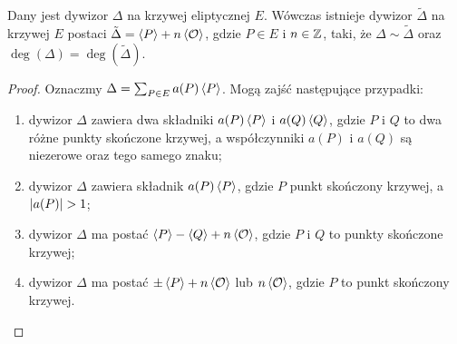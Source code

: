 \begin{theorem}\label{divisor_linear_reduction_theorem}
Dany jest dywizor $\Delta$ na krzywej eliptycznej $E$.
Wówczas istnieje dywizor $\tilde{\Delta}$ na krzywej $E$
postaci $\tilde{\Delta} = \left\langle P\right\rangle + n\left\langle\mathcal{O}\right\rangle$,
gdzie $P \in E$ i $n \in \mathbb{Z}$, taki,
że $\Delta \sim \tilde{\Delta}$ oraz $\deg(\Delta) = \deg(\tilde{\Delta})$.
\end{theorem}

\begin{proof}
Oznaczmy $\Delta = \sum_{P \in E}a(P)\left\langle P\right\rangle$.
Mogą zajść następujące przypadki:
\begin{enumerate}
\item dywizor $\Delta$ zawiera dwa składniki
$a(P)\left\langle P\right\rangle$ i $a(Q)\left\langle Q\right\rangle$,
gdzie $P$ i $Q$ to dwa różne punkty skończone krzywej,
a współczynniki $a(P)$ i $a(Q)$ są niezerowe oraz tego samego znaku;
\item dywizor $\Delta$ zawiera składnik $a(P)\left\langle P\right\rangle$,
gdzie $P$ punkt skończony krzywej, a $\lvert a(P)\rvert > 1$;
\item dywizor $\Delta$ ma postać $\left\langle P\right\rangle - \left\langle Q\right\rangle + n\left\langle\mathcal{O}\right\rangle$,
gdzie $P$ i $Q$ to punkty skończone krzywej;
\item dywizor $\Delta$ ma postać $\pm\left\langle P\right\rangle + n\left\langle\mathcal{O}\right\rangle$
lub $n\left\langle\mathcal{O}\right\rangle$,
gdzie $P$ to punkt skończony krzywej.
\end{enumerate}


\end{proof}
